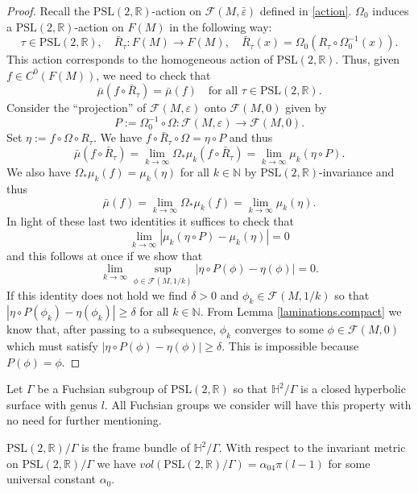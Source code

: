 \documentclass[11pt]{amsart}
\def\R{\mathbb R}
\def\H{\mathbb H}
\def\N{\mathbb N}
\theoremstyle{remark}
\theoremstyle{definition}
\begin{document}
{{\begin{proof}
		Recall the $ \text{PSL}(2,\R)$-action on  $\mathcal F(M,\bar\varepsilon)$ defined in \eqref{action}. $\Omega_0$ induces a $\text{PSL}(2,\R)$-action on $F(M)$ in the following way: 
		$$\tau\in \text{PSL}(2,\R), \quad \bar R_\tau: F(M)\rightarrow F(M), \quad \bar R_\tau(x)= \Omega_0(R_{\tau}\circ \Omega_0^{-1}(x)).$$
		This action corresponds to the homogeneous action of $\text{PSL}(2,\R)$. Thus, given $f\in C^0(F(M))$, we need to check that  $$\bar \mu(f\circ \bar R_\tau)=\bar \mu(f)\quad\mbox{for all }\tau\in\text{PSL}(2,\R).$$
		Consider the ``projection'' of $\mathcal F(M,\varepsilon)$ onto $\mathcal F(M,0)$ given by $$P:=\Omega_0^{-1}\circ\Omega:\mathcal F(M,\varepsilon)\rightarrow \mathcal F(M,0).$$  
		Set $\eta:=f\circ \Omega\circ R_\tau$. We have $f\circ \bar R_\tau\circ\Omega=\eta\circ P$ and thus
		\begin{equation*}%
			{\bar\mu}(f\circ \bar R_\tau)=\lim_{k\to\infty}\Omega_*\mu_k(f\circ \bar R_\tau)=\lim_{k\to\infty}\mu_k(\eta\circ P).
		\end{equation*}
		We also have $\Omega_*\mu_k(f)=\mu_k(\eta)$ for all $k\in\N$ by  $\text{PSL}(2,\R)$-invariance and thus
		\begin{equation*}%
			{\bar\mu} (f)=\lim_{k\to\infty}\Omega_*\mu_k(f)=\lim_{k\to\infty}\mu_k(\eta).
		\end{equation*}
		In light of these last two identities it suffices to check that
		$$\lim_{k\to \infty}|\mu_k(\eta\circ P)-\mu_k(\eta)|=0$$
		{and this follows at once if we show that}
		$$\lim_{k\to \infty}\sup_{\phi\in  \mathcal F(M,1/k)}|\eta\circ P(\phi)-\eta(\phi)|=0.$$
		{If this identity does not hold we find $\delta>0$ and $\phi_k\in  \mathcal F(M,1/k)$ so that $|\eta\circ P(\phi_k)-\eta(\phi_k)|\geq \delta$ for all $k\in\N$.
			From Lemma \ref{laminations.compact} we know that, after passing to a subsequence, $\phi_k$ converges to some $\phi\in  \mathcal F(M,0)$ which must satisfy $|\eta\circ P(\phi)-\eta(\phi)|\geq \delta$. This is impossible because $P(\phi)=\phi$.}
	\end{proof}
	
	
	
	
	
	Let $\Gamma$ be a Fuchsian subgroup of $\text{PSL}(2,\R)$  so that $\H^2/ \Gamma$ is a  closed hyperbolic surface with genus $l$. All Fuchsian groups we consider will have this property with no need for further mentioning.
	
	$\text{PSL}(2,\R)/ \Gamma$ is the frame bundle of $\H^2/ \Gamma$. With respect to the invariant metric on $\text{PSL}(2,\R)/ \Gamma$ we have $vol(\text{PSL}(2,\R)/ \Gamma)=\alpha_04\pi(l-1)$ for some universal constant $\alpha_0$.
	
}}
\end{document}
